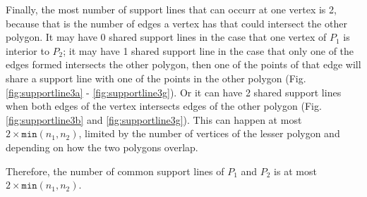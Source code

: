 \documentclass [12pt]{article}
\begin{document}
\begin{enumerate}[label=(\alph*)]
            \pagebreak

        Finally, the most number of support lines that can occurr at one vertex is 2, because that is the number of edges a vertex has that could intersect the other polygon. It may have 0 shared support lines in the case that one vertex of $P_1$ is interior to $P_2$; it may have 1 shared support line in the case that only one of the edges formed intersects the other polygon, then one of the points of that edge will share a support line with one of the points in the other polygon (Fig. \ref{fig:supportline3a} - \ref{fig:supportline3g}). Or it can have 2 shared support lines when both edges of the vertex intersects edges of the other polygon (Fig. \ref{fig:supportline3b} and \ref{fig:supportline3g}). This can happen at most $2 \times \texttt{min}(n_1, n_2)$, limited by the number of vertices of the lesser polygon and depending on how the two polygons overlap.



        
        Therefore, the number of common support lines of $P_1$ and $P_2$ is at most $2 \times \texttt{min}(n_1, n_2)$.


\end{enumerate}
\end{document}
